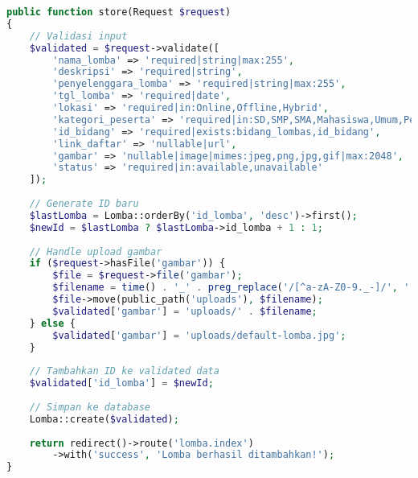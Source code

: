 \documentclass[12pt,a4paper]{article}
\begin{document}
\begin{lstlisting}[language=PHP]
public function store(Request $request)
{
    // Validasi input
    $validated = $request->validate([
        'nama_lomba' => 'required|string|max:255',
        'deskripsi' => 'required|string',
        'penyelenggara_lomba' => 'required|string|max:255',
        'tgl_lomba' => 'required|date',
        'lokasi' => 'required|in:Online,Offline,Hybrid',
        'kategori_peserta' => 'required|in:SD,SMP,SMA,Mahasiswa,Umum,Pelajar',
        'id_bidang' => 'required|exists:bidang_lombas,id_bidang',
        'link_daftar' => 'nullable|url',
        'gambar' => 'nullable|image|mimes:jpeg,png,jpg,gif|max:2048',
        'status' => 'required|in:available,unavailable'
    ]);
    
    // Generate ID baru
    $lastLomba = Lomba::orderBy('id_lomba', 'desc')->first();
    $newId = $lastLomba ? $lastLomba->id_lomba + 1 : 1;
    
    // Handle upload gambar
    if ($request->hasFile('gambar')) {
        $file = $request->file('gambar');
        $filename = time() . '_' . preg_replace('/[^a-zA-Z0-9._-]/', '', $file->getClientOriginalName());
        $file->move(public_path('uploads'), $filename);
        $validated['gambar'] = 'uploads/' . $filename;
    } else {
        $validated['gambar'] = 'uploads/default-lomba.jpg';
    }
    
    // Tambahkan ID ke validated data
    $validated['id_lomba'] = $newId;
    
    // Simpan ke database
    Lomba::create($validated);
    
    return redirect()->route('lomba.index')
        ->with('success', 'Lomba berhasil ditambahkan!');
}
\end{lstlisting}
\end{document}
